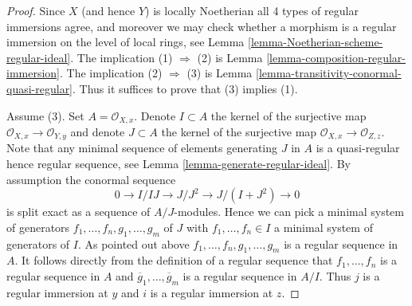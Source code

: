 \documentclass[10pt,a4paper]{amsart}
\theoremstyle{plain}
\theoremstyle{definition}
\theoremstyle{remark}
\numberwithin{equation}{subsection}
\begin{document}
\begin{proof}
Since $X$ (and hence $Y$) is locally Noetherian all 4 types of regular
immersions agree, and moreover we may check whether a morphism is a
regular immersion on the level of local rings, see
Lemma \ref{lemma-Noetherian-scheme-regular-ideal}.
The implication (1) $\Rightarrow$ (2) is
Lemma \ref{lemma-composition-regular-immersion}.
The implication (2) $\Rightarrow$ (3) is
Lemma \ref{lemma-transitivity-conormal-quasi-regular}.
Thus it suffices to prove that (3) implies (1).

\medskip\noindent
Assume (3). Set $A = \mathcal{O}_{X, x}$. Denote $I \subset A$ the kernel
of the surjective map $\mathcal{O}_{X, x} \to \mathcal{O}_{Y, y}$ and
denote $J \subset A$ the kernel
of the surjective map $\mathcal{O}_{X, x} \to \mathcal{O}_{Z, z}$.
Note that any minimal sequence of elements generating $J$ in $A$
is a quasi-regular hence regular sequence, see
Lemma \ref{lemma-generate-regular-ideal}.
By assumption the conormal sequence
$$
0 \to I/IJ \to J/J^2 \to J/(I + J^2) \to 0
$$
is split exact as a sequence of $A/J$-modules. Hence we can pick
a minimal system of generators $f_1, \ldots, f_n, g_1, \ldots, g_m$
of $J$ with $f_1, \ldots, f_n \in I$ a minimal system of generators of $I$.
As pointed out above $f_1, \ldots, f_n, g_1, \ldots, g_m$ is a regular
sequence in $A$. It follows directly from the definition of a regular
sequence that $f_1, \ldots, f_n$ is a regular sequence in $A$ and
$\overline{g}_1, \ldots, \overline{g}_m$ is a regular sequence in
$A/I$. Thus $j$ is a regular immersion at $y$ and $i$ is a regular
immersion at $z$.
\end{proof}
\end{document}
